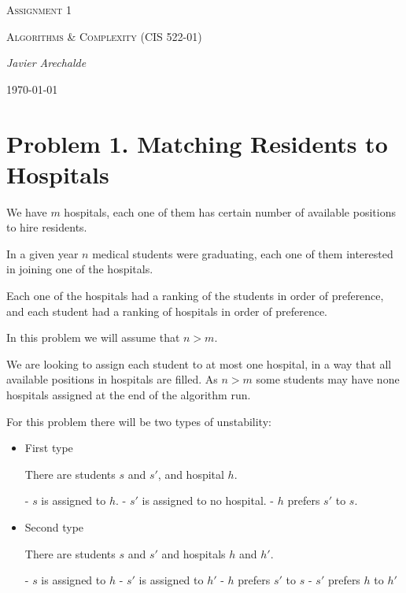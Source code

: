 \documentclass{article}
\begin{document}
\begin{titlepage}
	\centering
	{\scshape\LARGE Assignment 1\par}
	\vspace{1cm}
	{\scshape\Large Algorithms & Complexity (CIS 522-01)\par}
	\vspace{1.5cm}
	{\Large\itshape Javier Arechalde\par}
	\vfill
	{\large \today\par}
\end{titlepage}

\section*{Problem 1. Matching Residents to Hospitals}

We have $m$ hospitals, each one of them has certain number of available positions to hire residents.

In a given year $n$ medical students were graduating, each one of them interested in joining one of the hospitals.

Each one of the hospitals had a ranking of the students in order of preference, and each student had a ranking of hospitals in order of preference.

In this problem we will assume that $n>m$.

We are looking to assign each student to at most one hospital, in a way that all available positions in hospitals are filled. As $n>m$ some students may have none hospitals assigned at the end of the algorithm run.

For this problem there will be two types of unstability:

\begin{itemize}

\item{First type}

There are students $s$ and $s'$, and hospital $h$.

- $s$ is assigned to $h$.
- $s'$ is assigned to no hospital.
- $h$ prefers $s'$ to $s$.

\item{Second type}

There are students $s$ and $s'$ and hospitals $h$ and $h'$.

- $s$ is assigned to $h$
- $s'$ is assigned to $h'$
- $h$ prefers $s'$ to $s$
- $s'$ prefers $h$ to $h'$

\end{itemize}
\end{document}
